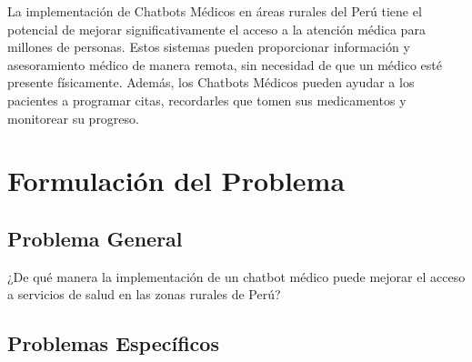 La implementación de Chatbots Médicos en áreas rurales del Perú tiene el potencial de mejorar significativamente el acceso a la atención médica para millones de personas. Estos sistemas pueden proporcionar información y asesoramiento médico de manera remota, sin necesidad de que un médico esté presente físicamente. Además, los Chatbots Médicos pueden ayudar a los pacientes a programar citas, recordarles que tomen sus medicamentos y monitorear su progreso. 



\section{Formulación del Problema}




\subsection{Problema General}
\newcommand{\ProblemaGeneral}{
¿De qué manera la implementación de un chatbot médico puede mejorar el acceso a servicios de salud en las zonas rurales de Perú?
}
\ProblemaGeneral
\subsection{Problemas Espec\'{i}ficos}
\newcommand{\Pbone}{
¿Cuáles son los desafíos y las oportunidades para la implementación de chatbots médicos en áreas rurales?
}
\newcommand{\Pbtwo}{
¿Qué características y funcionalidades debe tener un chatbot médico para ser efectivo en áreas rurales?
}
\newcommand{\Pbthree}{
¿Qué estrategias se pueden utilizar para promover la adopción y el uso del chatbot médico entre las poblaciones rurales?
}
\newcommand{\Pbfour}{
¿Qué métricas se pueden utilizar para evaluar la efectividad del chatbot médico en la mejora del acceso a la atención médica y los resultados de salud en las poblaciones rurales?
}



